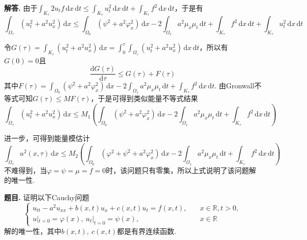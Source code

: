 \documentclass[12pt, a4paper, oneside]{ctexart}
\newcounter{problem}  %
\newenvironment{problem}{\stepcounter{problem}\par\noindent\textbf{题目\arabic{problem}. }}{\smallskip\par}
\newenvironment{solution}{\par\noindent\textbf{解答. }}{\smallskip\par}
\let\leq=\leqslant %
\def\R{\mathbb{R}}          %
\def\d{\mathrm{d}}          %
\def\add{\vspace{1ex}}      %
\begin{document}
\begin{solution}
    由于$\int_{K_\tau}2u_tf\,\d x\,\d t\leq \int_{K_\tau}u_t^2\,\d x\,\d t+\int_{K_\tau}f^2\,\d x\,\d t$，于是有
    \begin{equation*}
        \int_{\Omega_\tau}(u_t^2+a^2u_x^2)\,\d x\leq \int_{\Omega_0}(\psi^2+a^2\varphi_x^2)\,\d x-2\int_{\Omega_1}a^2\mu_x\mu_t\,\d t+\int_{K_\tau}f^2\,\d x\,\d t+ \int_{K_\tau}u_t^2\,\d x\,\d t
    \end{equation*}

    令$G(\tau) = \int_{K_\tau}(u_t^2+a^2u_x^2)\,\d x = \int_0^\tau\int_{\Omega_\tau}(u_t^2+a^2u_x^2)\,\d x\,\d t$，所以有$G(0) = 0$且
    \begin{equation*}
        \frac{\d G(\tau)}{\d\tau}\leq G(\tau)+F(\tau)
    \end{equation*}
    其中$F(\tau) = \int_{\Omega_0}(\psi^2+a^2\varphi_x^2)\,\d x-2\int_{\Omega_1}a^2\mu_x\mu_t\,\d t+\int_{K_\tau}f^2\,\d x\,\d t$. \add 由Gronwall不等式可知$G(\tau)\leq MF(\tau)$，于是可得到类似能量不等式结果
    \begin{equation*}
        \int_{\Omega_\tau}(u_t^2+a^2u_x^2)\,\d x \leq M_1\left(\int_{\Omega_0}(\psi^2+a^2\varphi_x^2)\,\d x-2\int_{\Omega_1}a^2\mu_x\mu_t\,\d t+\int_{K_\tau}f^2\,\d x\,\d t\right)
    \end{equation*}
    
    进一步，可得到能量模估计
    \begin{equation*}
        \int_{\Omega_\tau}u^2(x,\tau)\,\d x\leq M_2\left(\int_{\Omega_0}(\varphi^2+\psi^2+a^2\varphi_x^2)\,\d x-2\int_{\Omega_1}a^2\mu_x\mu_t\,\d t+\int_{K_\tau}f^2\,\d x\,\d t\right)
    \end{equation*}
    不难得到，当$\varphi=\psi=\mu=f=0$时，该问题只有零集，所以上式说明了该问题解的唯一性.
\end{solution}
\begin{problem}
    证明以下Cauchy问题
    \begin{equation*}
        \begin{cases}
            u_{tt}-a^2u_{xx}+b(x,t)u_x+c(x,t)u_t=f(x,t),&\quad x\in\R,t > 0,\\
            u|_{t=0} = \varphi(x),\ u_t|_{t=0}=\psi(x),&\quad x\in\R
        \end{cases}
    \end{equation*}
    解的唯一性，其中$b(x,t),\ c(x,t)$都是有界连续函数.
\end{problem}
\end{document}
